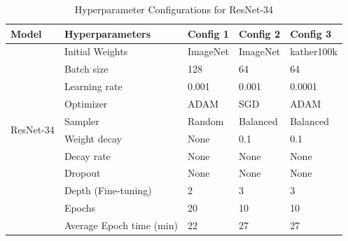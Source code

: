 \documentclass[
11pt, %
english, %
singlespacing, %
headsepline, %
]{project_structure}
\begin{document}
\begin{table}[H]
\centering
\label{tab:resnet_hyperparameters_2}
\begin{tabular}{@{}lllll@{}}
\toprule
\textbf{Model} & \textbf{Hyperparameters} & \textbf{\acrshort{Config} 1} & \textbf{\acrshort{Config} 2} & \textbf{\acrshort{Config} 3} \\
\midrule
 \multirow{10}{*}{\acrshort{ResNet}-34} & 
 \multicolumn{1}{l}{Initial Weights} & \multicolumn{1}{l}{ImageNet} & \multicolumn{1}{l}{ImageNet} & \multicolumn{1}{l}{kather100k} \\
 & \multicolumn{1}{l}{Batch size} & \multicolumn{1}{l}{128} & \multicolumn{1}{l}{64} & \multicolumn{1}{l}{64} \\
 & \multicolumn{1}{l}{Learning rate} & \multicolumn{1}{l}{0.001} & \multicolumn{1}{l}{0.001} & \multicolumn{1}{l}{0.0001} \\
 & \multicolumn{1}{l}{Optimizer} & \multicolumn{1}{l}{ADAM} & \multicolumn{1}{l}{SGD} & \multicolumn{1}{l}{ADAM} \\
 & \multicolumn{1}{l}{Sampler} & \multicolumn{1}{l}{Random} & \multicolumn{1}{l}{Balanced} & \multicolumn{1}{l}{Balanced} \\
 & \multicolumn{1}{l}{Weight decay} & \multicolumn{1}{l}{None} & \multicolumn{1}{l}{0.1} & \multicolumn{1}{l}{0.1} \\
 & \multicolumn{1}{l}{Decay rate} & \multicolumn{1}{l}{None} & \multicolumn{1}{l}{None} & \multicolumn{1}{l}{None} \\
 & \multicolumn{1}{l}{Dropout} & \multicolumn{1}{l}{None} & \multicolumn{1}{l}{None} & \multicolumn{1}{l}{None} \\
 & \multicolumn{1}{l}{Depth (Fine-tuning)} & \multicolumn{1}{l}{2} & \multicolumn{1}{l}{3} & \multicolumn{1}{l}{3} \\
 & \multicolumn{1}{l}{Epochs} & \multicolumn{1}{l}{20} & \multicolumn{1}{l}{10} & \multicolumn{1}{l}{10} \\
                                 
\midrule
& \multicolumn{1}{l}{Average Epoch time (\acrshort{min})} & \multicolumn{1}{l}{22} & \multicolumn{1}{l}{27} & \multicolumn{1}{l}{27} \\
\bottomrule

\end{tabular}
\caption{Hyperparameter Configurations for \acrshort{ResNet}-34}
\label{tab:resnet34_configs}
\end{table}
\end{document}
